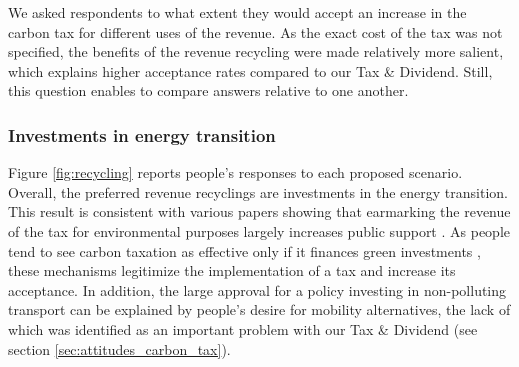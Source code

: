 \documentclass[english,5p,authoryear]{elsarticle}
\begin{document}
We asked respondents to what extent they would accept an increase in the carbon tax for different uses of the revenue. As the exact cost of the tax was not specified, the benefits of the revenue recycling were made relatively more salient, which explains higher acceptance rates compared to our Tax \& Dividend. Still, this question enables to compare answers relative to one another.

        \subsubsection{Investments in energy transition}

Figure \ref{fig:recycling} reports people's responses to each proposed scenario. Overall, the preferred revenue recyclings are investments in the energy transition. This result is consistent with various papers showing that earmarking the revenue of the tax for environmental purposes largely increases public support \citep[for a review of the literature, see for instance][]{kallbekken_aasen_2010,carattini_overcoming_2018}. As people tend to see carbon taxation as effective only if it finances green investments \citep{saelen_kallbekken_2011}, these mechanisms legitimize the implementation of a tax and increase its acceptance. In addition, the large approval for a policy investing in non-polluting transport can be explained by people's desire for mobility alternatives, the lack of which was identified as an important problem with our Tax \& Dividend (see section \ref{sec:attitudes_carbon_tax}). 

\end{document}
